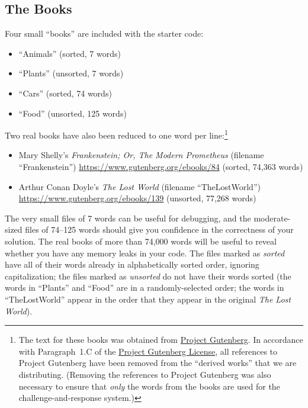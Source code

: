 \subsection*{The Books}

Four small ``books'' are included with the starter code:

\begin{itemize}
    \item ``Animals'' (sorted, 7 words)
    \item ``Plants'' (unsorted, 7 words)
    \item ``Cars'' (sorted, 74 words)
    \item ``Food'' (unsorted, 125 words)
\end{itemize}

Two real books have also been reduced to one word per line:\footnote{The text for these books was obtained from \href{https://www.gutenberg.org/}{Project Gutenberg}.
In accordance with Paragraph~1.C of the \href{https://www.gutenberg.org/policy/license}{Project Gutenberg License}, all references to Project Gutenberg have been removed from the ``derived works'' that we are distributing.
(Removing the references to Project Gutenberg was also necessary to ensure that \textit{only} the words from the books are used for the challenge-and-response system.)}

\begin{itemize}
    \item Mary Shelly's \textit{Frankenstein; Or, The Modern Prometheus} (filename ``Frankenstein'') \url{https://www.gutenberg.org/ebooks/84} (sorted, 74,363 words)
    \item Arthur Conan Doyle's \textit{The Lost World} (filename ``TheLostWorld'')
    \url{https://www.gutenberg.org/ebooks/139} (unsorted, 77,268 words)
\end{itemize}

The very small files of 7 words can be useful for debugging, and the moderate-sized files of 74--125 words should give you confidence in the correctness of your solution.
The real books of more than 74,000 words will be useful to reveal whether you have any memory leaks in your code.
The files marked as \textit{sorted} have all of their words already in alphabetically sorted order, ignoring capitalization;
the files marked as \textit{unsorted} do not have their words sorted (the words in ``Plants'' and ``Food'' are in a randomly-selected order;
the words in ``TheLostWorld'' appear in the order that they appear in the original \textit{The Lost World}).


